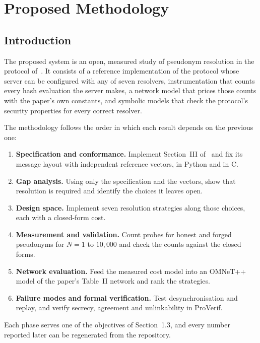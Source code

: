 \chapter{Proposed Methodology}

\section{Introduction}
The proposed system is an open, measured study of pseudonym resolution in the protocol of~\cite{base}. It consists of a reference implementation of the protocol whose server can be configured with any of seven resolvers, instrumentation that counts every hash evaluation the server makes, a network model that prices those counts with the paper's own constants, and symbolic models that check the protocol's security properties for every correct resolver.

The methodology follows the order in which each result depends on the previous one:
\begin{enumerate}
\item \textbf{Specification and conformance.} Implement Section~III of~\cite{base} and fix its message layout with independent reference vectors, in Python and in C.
\item \textbf{Gap analysis.} Using only the specification and the vectors, show that resolution is required and identify the choices it leaves open.
\item \textbf{Design space.} Implement seven resolution strategies along those choices, each with a closed-form cost.
\item \textbf{Measurement and validation.} Count probes for honest and forged pseudonyms for $N=1$ to $10{,}000$ and check the counts against the closed forms.
\item \textbf{Network evaluation.} Feed the measured cost model into an OMNeT++ model of the paper's Table~II network and rank the strategies.
\item \textbf{Failure modes and formal verification.} Test desynchronisation and replay, and verify secrecy, agreement and unlinkability in ProVerif.
\end{enumerate}
Each phase serves one of the objectives of Section~1.3, and every number reported later can be regenerated from the repository.

